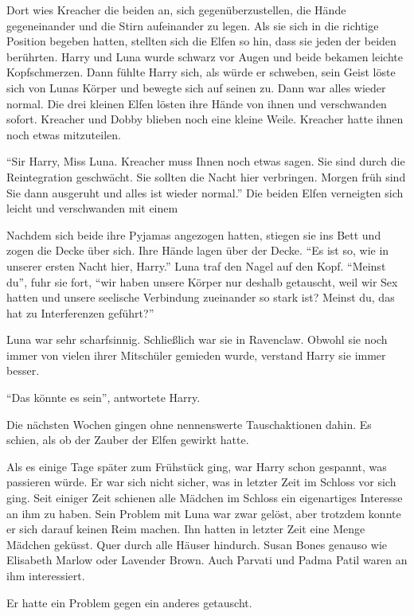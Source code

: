 Dort wies Kreacher die beiden an, sich gegenüberzustellen, die Hände gegeneinander und die Stirn aufeinander zu legen. Als sie sich in die richtige Position begeben hatten, stellten sich die Elfen so hin, dass sie jeden der beiden berührten. Harry und Luna wurde schwarz vor Augen und beide bekamen leichte Kopfschmerzen. Dann fühlte Harry sich, als würde er schweben, sein Geist löste sich von Lunas Körper und bewegte sich auf seinen zu. Dann war alles wieder normal. Die drei kleinen Elfen lösten ihre Hände von ihnen und verschwanden sofort. Kreacher und Dobby blieben noch eine kleine Weile. Kreacher hatte ihnen noch etwas mitzuteilen.

\enquote{Sir Harry, Miss Luna. Kreacher muss Ihnen noch etwas sagen. Sie sind durch die Reintegration geschwächt. Sie sollten die Nacht hier verbringen. Morgen früh sind Sie dann ausgeruht und alles ist wieder normal.} Die beiden Elfen verneigten sich leicht und verschwanden mit einem 

Nachdem sich beide ihre Pyjamas angezogen hatten, stiegen sie ins Bett und zogen die Decke über sich. Ihre Hände lagen über der Decke. \enquote{Es ist so, wie in unserer ersten Nacht hier, Harry.} Luna traf den Nagel auf den Kopf. \enquote{Meinst du}, fuhr sie fort, \enquote{wir haben unsere Körper nur deshalb getauscht, weil wir Sex hatten und unsere seelische Verbindung zueinander so stark ist? Meinst du, das hat zu Interferenzen geführt?}

Luna war sehr scharfsinnig. Schließlich war sie in Ravenclaw. Obwohl sie noch immer von vielen ihrer Mitschüler gemieden wurde, verstand Harry sie immer besser.

\enquote{Das könnte es sein}, antwortete Harry.

Die nächsten Wochen gingen ohne nennenswerte Tauschaktionen dahin. Es schien, als ob der Zauber der Elfen gewirkt hatte.

Als es einige Tage später zum Frühstück ging, war Harry schon gespannt, was passieren würde. Er war sich nicht sicher, was in letzter Zeit im Schloss vor sich ging. Seit einiger Zeit schienen alle Mädchen im Schloss ein eigenartiges Interesse an ihm zu haben. Sein Problem mit Luna war zwar gelöst, aber trotzdem konnte er sich darauf keinen Reim machen. Ihn hatten in letzter Zeit eine Menge Mädchen geküsst. Quer durch alle Häuser hindurch. Susan Bones genauso wie Elisabeth Marlow oder Lavender Brown. Auch Parvati und Padma Patil waren an ihm interessiert.

Er hatte ein Problem gegen ein anderes getauscht.




